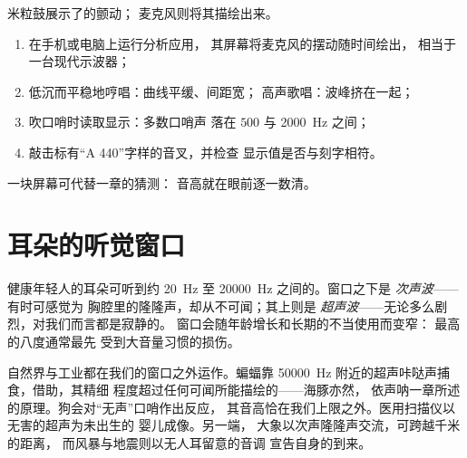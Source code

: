 \begin{method}[看见声音]\label{met:g8:sound-pitch-loudness:seeing}
米粒鼓展示了的颤动；
麦克风则将其描绘出来。
\begin{enumerate}
  \item 在手机或电脑上运行分析应用，
        其屏幕将麦克风的摆动随时间绘出，
        相当于一台现代示波器；
  \item 低沉而平稳地哼唱：曲线平缓、间距宽；
        高声歌唱：波峰挤在一起；
  \item 吹口哨时读取显示：多数口哨声
        落在 $500$ 与 \qty{2000}{Hz} 之间；
  \item 敲击标有“A 440”字样的音叉，并检查
        显示值是否与刻字相符。
\end{enumerate}
一块屏幕可代替一章的猜测：
音高就在眼前逐一数清。
\end{method}

\section{耳朵的听觉窗口}

\begin{proposition}[人耳的听觉范围]\label{prop:g8:sound-pitch-loudness:range}
健康年轻人的耳朵可听到约
\qty{20}{Hz} 至 \qty{20000}{Hz} 之间的。窗口之下是
\emph{次声波}——有时可感觉为
胸腔里的隆隆声，却从不可闻；其上则是
\emph{超声波}——无论多么剧烈，对我们而言都是寂静的。
窗口会随年龄增长和长期的不当使用而变窄：
最高的八度通常最先
受到大音量习惯的损伤。
\end{proposition}

\begin{example}[边界之外]\label{ex:g8:sound-pitch-loudness:beyond}
自然界与工业都在我们的窗口之外运作。蝙蝠靠
\qty{50000}{Hz} 附近的超声咔哒声捕食，借助，其精细
程度超过任何可闻所能描绘的——海豚亦然，
依声呐一章所述的原理。狗会对“无声”口哨作出反应，
其音高恰在我们上限之外。医用扫描仪以无害的超声为未出生的
婴儿成像。另一端，
大象以次声隆隆声交流，可跨越千米的距离，
而风暴与地震则以无人耳留意的音调
宣告自身的到来。
\end{example}

